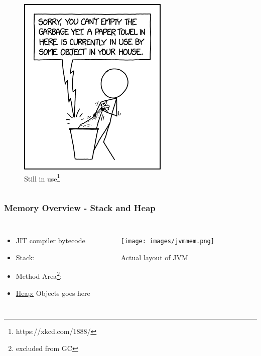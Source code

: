\documentclass{beamer}
\begin{document}
\begin{frame}
\begin{columns}
        
        \begin{figure}
            \centering
            \includegraphics[width=\textwidth]{still_in_use.png}
            \caption[xkcd_1888]{Still in use\footnote{https://xkcd.com/1888/}} %
        \end{figure}
        
      \end{columns}

\end{frame}
\begin{frame}
    \frametitle{Memory Overview - Stack and Heap}
    \begin{columns}
        \begin{itemize}
            \item JIT compiler bytecode
            \item Stack: 
            \item Method Area\footnote{excluded from GC}: 
            \item \underline{Heap:} Objects goes here
        \end{itemize} 
       
        \begin{figure}
            \centering
            \texttt{[image: images/jvmmem.png]}
            \caption{Actual layout of JVM\cite{noauthor_memory_nodate}}
        \end{figure}
        
      \end{columns}
 
\end{frame}
\end{document}

